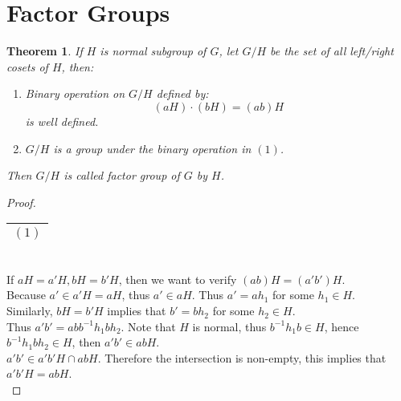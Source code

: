 \documentclass{article}
\theoremstyle{MyNonumberplain}
\theoremstyle{break}
\newtheorem*{proof}{Proof. }
\theoremstyle{break}
\newtheorem{theorem}{Theorem}[section]
\theoremstyle{break}
\theoremstyle{definition}
\theoremstyle{break}
\begin{document}
\newpage

\section{Factor Groups}

\begin{thmbox}
    \begin{theorem}
        If $H$ is normal subgroup of $G$, let $G / H$ be the set of all left/right
        cosets of $H$, then:\\
        \begin{enumerate}
        \item Binary operation on $G / H$ defined by:
        \[ (a H) \cdot (b H) = (a b) H \]
        is well defined.\\
        \item $G / H$ is a group under the binary operation in $(1)$.\\
        \end{enumerate}
        Then $G / H$ is called factor group of $G$ by $H$.
    \end{theorem}
    \begin{prfbox}
        \begin{proof}
            \begin{tabular}{|c|}
                \hline
                $(1)$\\
                \hline
              \end{tabular}\\
              
              If $a H = a' H, b H = b' H$, then we want to verify $(a b) H = (a' b') H$.\\
              
              Because $a' \in a' H = a H$, thus $a' \in a H$. Thus $a' = a h_1$ for some
              $h_1 \in H$.\\
              
              Similarly, $b H = b' H$ implies that $b' = b h_2$ for some $h_2 \in H$.\\
              
              Thus $a' b' = a b b^{- 1} h_1 b h_2$. Note that $H$ is normal, thus $b^{- 1}
              h_1 b \in H$, hence $b^{- 1} h_1 b h_2 \in H$, then $a' b' \in a b H$.\\
              
              $a' b' \in a' b' H \cap a b H$. Therefore the intersection is non-empty, this
              implies that $a' b' H = a b H$.\\
              

\end{proof}
\end{prfbox}
\end{thmbox}
\end{document}
